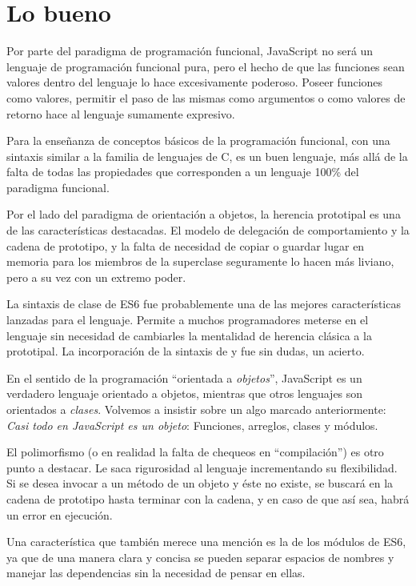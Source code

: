\section*{Lo bueno}

Por parte del paradigma de programación funcional, JavaScript no será un lenguaje de programación funcional pura, pero el hecho de que las funciones sean valores dentro del lenguaje lo hace excesivamente poderoso. Poseer funciones como valores, permitir el paso de las mismas como argumentos o como valores de retorno hace al lenguaje sumamente expresivo.

Para la enseñanza de conceptos básicos de la programación funcional, con una sintaxis similar a la familia de lenguajes de C, es un buen lenguaje, más allá de la falta de todas las propiedades que corresponden a un lenguaje 100\% del paradigma funcional.

Por el lado del paradigma de orientación a objetos, la herencia prototipal es una de las características destacadas. El modelo de delegación de comportamiento y la cadena de prototipo, y la falta de necesidad de copiar o guardar lugar en memoria para los miembros de la superclase seguramente lo hacen más liviano, pero a su vez con un extremo poder.
 
La sintaxis de clase de ES6 fue probablemente una de las mejores características lanzadas para el lenguaje. Permite a muchos programadores meterse en el lenguaje sin necesidad de cambiarles la mentalidad de herencia clásica a la prototipal. La incorporación de la sintaxis de  y  fue sin dudas, un acierto.

En el sentido de la programación "`orientada a \textit{objetos}"', JavaScript es un verdadero lenguaje orientado a objetos, mientras que otros lenguajes son orientados a \textit{clases}. Volvemos a insistir sobre un algo marcado anteriormente: \textit{Casi todo en JavaScript es un objeto}: Funciones, arreglos, clases y módulos.

El polimorfismo (o en realidad la falta de chequeos en "`compilación"') es otro punto a destacar. Le saca rigurosidad al lenguaje incrementando su flexibilidad. Si se desea invocar a un método de un objeto y éste no existe, se buscará en la cadena de prototipo hasta terminar con la cadena, y en caso de que así sea, habrá un error en ejecución.

Una característica que también merece una mención es la de los módulos de ES6, ya que de una manera clara y concisa se pueden separar espacios de nombres y manejar las dependencias sin la necesidad de pensar en ellas.
